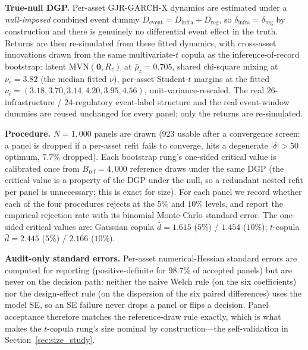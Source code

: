 \documentclass[pdflatex,sn-mathphys-num]{sn-jnl}
\theoremstyle{thmstyleone}
\theoremstyle{thmstyletwo}
\theoremstyle{thmstylethree}
\begin{document}
\begin{appendices}
\textbf{True-null DGP.} Per-asset GJR-GARCH-X dynamics are estimated under a \emph{null-imposed} combined event dummy $D_{\text{event}}=D_{\text{infra}}+D_{\text{reg}}$, so $\delta_{\text{infra}}=\delta_{\text{reg}}$ by construction and there is genuinely no differential event effect in the truth. Returns are then re-simulated from these fitted dynamics, with cross-asset innovations drawn from the same multivariate-$t$ copula as the inference-of-record bootstrap: latent $\mathrm{MVN}(\mathbf{0},R_z)$ at $\bar\rho_z=0.705$, shared chi-square mixing at $\nu_c=3.82$ (the median fitted $\nu$), per-asset Student-$t$ margins at the fitted $\nu_i=(3.18,3.70,3.14,4.20,3.95,4.56)$, unit-variance-rescaled. The real $26$-infrastructure / $24$-regulatory event-label structure and the real event-window dummies are reused unchanged for every panel; only the returns are re-simulated.

\textbf{Procedure.} $N=1{,}000$ panels are drawn (923 usable after a convergence screen: a panel is dropped if a per-asset refit fails to converge, hits a degenerate $|\delta|>50$ optimum, $7.7\%$ dropped). Each bootstrap rung's one-sided critical value is calibrated once from $B_{\text{ref}}=4{,}000$ reference draws under the same DGP (the critical value is a property of the DGP under the null, so a redundant nested refit per panel is unnecessary; this is exact for size). For each panel we record whether each of the four procedures rejects at the $5\%$ and $10\%$ levels, and report the empirical rejection rate with its binomial Monte-Carlo standard error. The one-sided critical values are: Gaussian copula $\bar d=1.615$ ($5\%$) / $1.454$ ($10\%$); $t$-copula $\bar d=2.445$ ($5\%$) / $2.166$ ($10\%$).

\textbf{Audit-only standard errors.} Per-asset numerical-Hessian standard errors are computed for reporting (positive-definite for $98.7\%$ of accepted panels) but are never on the decision path: neither the naive Welch rule (on the six coefficients) nor the design-effect rule (on the dispersion of the six paired differences) uses the model SE, so an SE failure never drops a panel or flips a decision. Panel acceptance therefore matches the reference-draw rule exactly, which is what makes the $t$-copula rung's size nominal by construction---the self-validation in Section~\ref{sec:size_study}.

\end{appendices}



\end{document}
